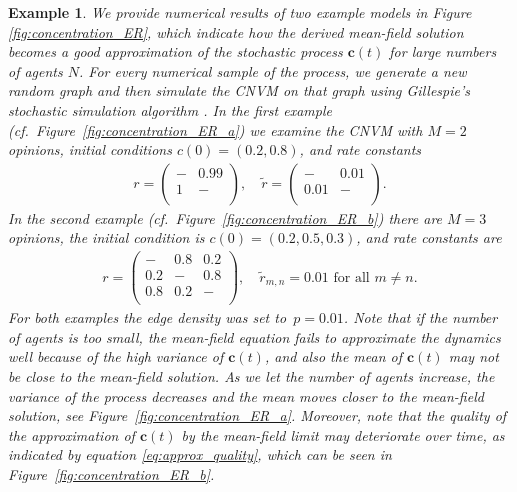\documentclass[a4paper,
               10pt,
               pdftex,
               normalheadings,
               headsepline,
               footsepline,
               headinclude,
               footinclude,
               DIV=14,
               abstracton]
{scrartcl}
\newtheorem{example}[theorem]{Example}
\newcommand{\rv}[1]{\bm{#1}}
\newcommand{\review}[1]{{#1}}
\begin{document}
\begin{example} \label{example:ER}
We provide numerical results of two example models in Figure \ref{fig:concentration_ER}, which indicate how the derived mean-field solution becomes a good approximation of the stochastic process $\rv{c}(t)$ for large numbers of agents $N$. 
\review{For every numerical sample of the process, we generate a new random graph and then simulate the CNVM on that graph using Gillespie's stochastic simulation algorithm \cite{Gillespie1977}.}
In the first example (cf.\ Figure~\ref{fig:concentration_ER_a}) we examine the CNVM with $M=2$ opinions, initial conditions $c(0) = (0.2, 0.8)$, and rate constants
\begin{align}
    r = \begin{pmatrix}
         - & 0.99\\
         1 & - \\
         \end{pmatrix},
    \quad \tilde{r} = \begin{pmatrix}
         - & 0.01\\
         0.01 & - \\
         \end{pmatrix}.
\end{align}
In the second example (cf.\ Figure~\ref{fig:concentration_ER_b}) there are $M=3$ opinions, the initial condition is $c(0) = (0.2, 0.5, 0.3)$, and rate constants are
\begin{align}
    r = \begin{pmatrix}
         - & 0.8 & 0.2\\
         0.2 & - & 0.8\\
         0.8 & 0.2 & - \\
         \end{pmatrix},
    \quad \tilde{r}_{m,n} = 0.01 \text{ for all } m\neq n.
\end{align}
For both examples the edge density was set to~$p=0.01$. 
Note that if the number of agents is too small, the mean-field equation fails to approximate the dynamics well because of the high variance of $\rv{c}(t)$, and also the mean of $\rv{c}(t)$ may not be close to the mean-field solution.
\review{As we let the number of agents increase, the variance of the process decreases and the mean moves closer to the mean-field solution, see Figure~\ref{fig:concentration_ER_a}.}
Moreover, note that the quality of the approximation of $\rv{c}(t)$ by the mean-field limit may deteriorate over time, as indicated by equation \eqref{eq:approx_quality}, which can be seen in Figure~\ref{fig:concentration_ER_b}.


\end{example}
\end{document}
